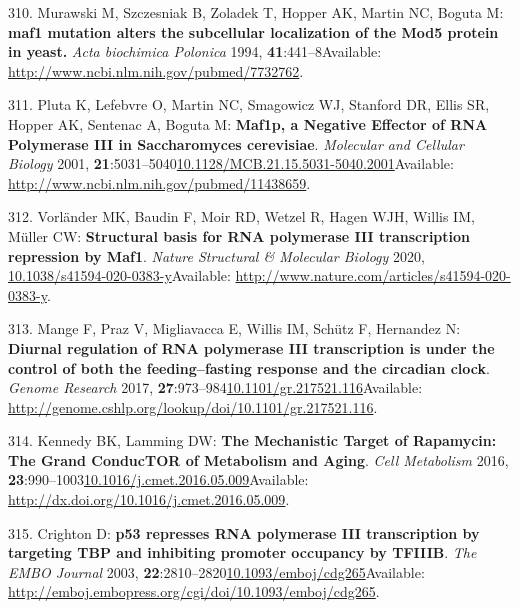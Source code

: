 \documentclass[
]{book}
\begin{document}
\leavevmode\hypertarget{ref-Murawski1994}{}%
310. Murawski M, Szczesniak B, Zoladek T, Hopper AK, Martin NC, Boguta M: \textbf{maf1 mutation alters the subcellular localization of the Mod5 protein in yeast.} \emph{Acta biochimica Polonica} 1994, \textbf{41}:441--8Available: \url{http://www.ncbi.nlm.nih.gov/pubmed/7732762}.

\leavevmode\hypertarget{ref-Pluta2001}{}%
311. Pluta K, Lefebvre O, Martin NC, Smagowicz WJ, Stanford DR, Ellis SR, Hopper AK, Sentenac A, Boguta M: \textbf{Maf1p, a Negative Effector of RNA Polymerase III in Saccharomyces cerevisiae}. \emph{Molecular and Cellular Biology} 2001, \textbf{21}:5031--5040\href{https://doi.org/10.1128/MCB.21.15.5031-5040.2001}{10.1128/MCB.21.15.5031-5040.2001}Available: \url{http://www.ncbi.nlm.nih.gov/pubmed/11438659}.

\leavevmode\hypertarget{ref-Vorlander2020}{}%
312. Vorländer MK, Baudin F, Moir RD, Wetzel R, Hagen WJH, Willis IM, Müller CW: \textbf{Structural basis for RNA polymerase III transcription repression by Maf1}. \emph{Nature Structural \& Molecular Biology} 2020, \href{https://doi.org/10.1038/s41594-020-0383-y}{10.1038/s41594-020-0383-y}Available: \url{http://www.nature.com/articles/s41594-020-0383-y}.

\leavevmode\hypertarget{ref-Mange2017}{}%
313. Mange F, Praz V, Migliavacca E, Willis IM, Schütz F, Hernandez N: \textbf{Diurnal regulation of RNA polymerase III transcription is under the control of both the feeding--fasting response and the circadian clock}. \emph{Genome Research} 2017, \textbf{27}:973--984\href{https://doi.org/10.1101/gr.217521.116}{10.1101/gr.217521.116}Available: \url{http://genome.cshlp.org/lookup/doi/10.1101/gr.217521.116}.

\leavevmode\hypertarget{ref-Kennedy2016}{}%
314. Kennedy BK, Lamming DW: \textbf{The Mechanistic Target of Rapamycin: The Grand ConducTOR of Metabolism and Aging}. \emph{Cell Metabolism} 2016, \textbf{23}:990--1003\href{https://doi.org/10.1016/j.cmet.2016.05.009}{10.1016/j.cmet.2016.05.009}Available: \url{http://dx.doi.org/10.1016/j.cmet.2016.05.009}.

\leavevmode\hypertarget{ref-Crighton2003}{}%
315. Crighton D: \textbf{p53 represses RNA polymerase III transcription by targeting TBP and inhibiting promoter occupancy by TFIIIB}. \emph{The EMBO Journal} 2003, \textbf{22}:2810--2820\href{https://doi.org/10.1093/emboj/cdg265}{10.1093/emboj/cdg265}Available: \url{http://emboj.embopress.org/cgi/doi/10.1093/emboj/cdg265}.
\end{document}
